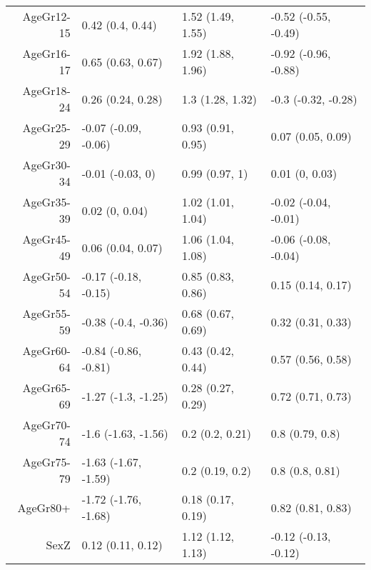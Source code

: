 \begin{table}[ht]
\begin{tabular}{rlll}
  AgeGr12-15 & 0.42 (0.4, 0.44) & 1.52 (1.49, 1.55) & -0.52 (-0.55, -0.49) \\ 
  AgeGr16-17 & 0.65 (0.63, 0.67) & 1.92 (1.88, 1.96) & -0.92 (-0.96, -0.88) \\ 
  AgeGr18-24 & 0.26 (0.24, 0.28) & 1.3 (1.28, 1.32) & -0.3 (-0.32, -0.28) \\ 
  AgeGr25-29 & -0.07 (-0.09, -0.06) & 0.93 (0.91, 0.95) & 0.07 (0.05, 0.09) \\ 
  AgeGr30-34 & -0.01 (-0.03, 0) & 0.99 (0.97, 1) & 0.01 (0, 0.03) \\ 
  AgeGr35-39 & 0.02 (0, 0.04) & 1.02 (1.01, 1.04) & -0.02 (-0.04, -0.01) \\ 
  AgeGr45-49 & 0.06 (0.04, 0.07) & 1.06 (1.04, 1.08) & -0.06 (-0.08, -0.04) \\ 
  AgeGr50-54 & -0.17 (-0.18, -0.15) & 0.85 (0.83, 0.86) & 0.15 (0.14, 0.17) \\ 
  AgeGr55-59 & -0.38 (-0.4, -0.36) & 0.68 (0.67, 0.69) & 0.32 (0.31, 0.33) \\ 
  AgeGr60-64 & -0.84 (-0.86, -0.81) & 0.43 (0.42, 0.44) & 0.57 (0.56, 0.58) \\ 
  AgeGr65-69 & -1.27 (-1.3, -1.25) & 0.28 (0.27, 0.29) & 0.72 (0.71, 0.73) \\ 
  AgeGr70-74 & -1.6 (-1.63, -1.56) & 0.2 (0.2, 0.21) & 0.8 (0.79, 0.8) \\ 
  AgeGr75-79 & -1.63 (-1.67, -1.59) & 0.2 (0.19, 0.2) & 0.8 (0.8, 0.81) \\ 
  AgeGr80+ & -1.72 (-1.76, -1.68) & 0.18 (0.17, 0.19) & 0.82 (0.81, 0.83) \\ 
  SexZ & 0.12 (0.11, 0.12) & 1.12 (1.12, 1.13) & -0.12 (-0.13, -0.12) \\ 
   \hline
\end{tabular}
\end{table}
